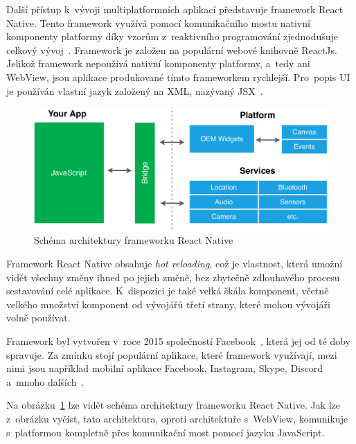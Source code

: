 Další přístup k~vývoji multiplatformních aplikací představuje framework
React Native.
Tento framework využívá pomocí komunikačního mostu nativní komponenty platformy
díky vzorům z~reaktivního programování zjednodušuje celkový
vývoj~\cite{hackernoon_flutter}.
Framework je založen na populární webové
knihovně \mbox{ReactJs}.
Jelikož framework nepoužívá nativní komponenty platformy,
a~tedy ani WebView,
jsou aplikace produkované tímto frameworkem
rychlejší.\linebreak
Pro~popis UI je používán vlastní jazyk založený na XML,
nazývaný JSX~\cite{dashmagazine_mobile_frameworks}.

\begin{figure}
    \centering
    \includegraphics[width=\linewidth]{assets/technology-research/framework/react_native.pdf}
    \caption{Schéma architektury frameworku React Native~\cite{hackernoon_flutter}}
    \label{fig:framework_react_native}
\end{figure}

Framework React Native obsahuje \emph{hot reloading},
což je vlastnost,
která umožní vidět všechny změny ihned po jejich změně,
bez zbytečně zdlouhavého procesu sestavování celé aplikace.
K~dispozici je také velká škála komponent,
včetně velkého množství komponent od vývojářů třetí strany, 
které mohou vývojáři volně používat.~\cite{dashmagazine_mobile_frameworks}

Framework byl vytvořen v~roce 2015
společností Facebook~\cite{hackernoon_flutter},
která jej od té doby spravuje.
Za zmínku stojí populární aplikace,
které framework využívají,
mezi nimi jsou například mobilní aplikace Facebook, Instagram, Skype, Discord
a~mnoho dalších~\cite{react_native}.

Na obrázku~\ref{fig:framework_react_native} lze vidět schéma architektury
frameworku React Native.
Jak lze z~obrázku vyčíst,
tato architektura,
oproti architektuře s~WebView,
komunikuje s~platformou kompletně přes komunikační most pomocí jazyku
JavaScript.

